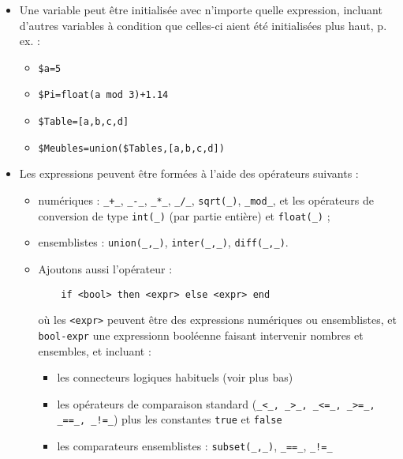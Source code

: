 \begin{itemize}
\item Une variable peut être initialisée avec n'importe quelle expression, incluant d'autres variables à condition que celles-ci aient été initialisées plus haut, p. ex. :
\begin{itemize}
	\item \verb&$a=5&
	\item \verb&$Pi=float(a mod 3)+1.14&
	\item \verb&$Table=[a,b,c,d]&
    \item \verb&$Meubles=union($Tables,[a,b,c,d])&\\
	\end{itemize}
\item Les expressions peuvent être formées à l'aide des opérateurs suivants : 
	\begin{itemize}
	\item numériques : \texttt{\_+\_}, \texttt{\_-\_}, \texttt{\_*\_}, 
    \texttt{\_/\_}, \texttt{sqrt(\_)}, \texttt{\_mod\_},  
    et les opérateurs de conversion de 
        type \texttt{int(\_)} (par partie entière) et \texttt{float(\_)} ; 
	\item ensemblistes : \texttt{union(\_,\_)}, 
    \texttt{inter(\_,\_)}, 	\texttt{diff(\_,\_)}. 
	\item Ajoutons aussi l'opérateur :
	\begin{verbatim}
	if <bool> then <expr> else <expr> end
    \end{verbatim}
	où les \texttt{<expr>} peuvent être des expressions numériques ou 
    ensemblistes, et \texttt{bool-expr} une expressionn booléenne faisant 
    intervenir nombres et ensembles, et incluant :
	\begin{itemize}
	\item les connecteurs logiques habituels (voir plus bas)
	\item les opérateurs de comparaison standard (\texttt{\_<\_, \_>\_, \_<=\_, 
    \_>=\_, \_==\_, \_!=\_}) plus les constantes \texttt{true} et \texttt{false}
	\item les comparateurs ensemblistes : \texttt{subset(\_,\_)}, 
    \texttt{\_==\_}, \texttt{\_!=\_}\\
	\end{itemize}
    \end{itemize}


\end{itemize}
